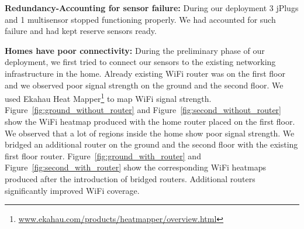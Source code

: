 \documentclass[10pt]{sensys-proc}
\newcommand{\figref}[1]{Figure~\ref{#1}}
\begin{document}
\noindent \textbf{Redundancy-Accounting for sensor failure:} During our deployment 3 jPlugs and 1 multisensor stopped functioning properly. We had accounted for such failure and had kept reserve sensors ready. %

\noindent \textbf{Homes have poor connectivity:} During the preliminary phase of our deployment, we first tried to connect our sensors to the existing networking infrastructure in the home. Already existing WiFi router was on the first floor and we observed poor signal strength on the ground and the second floor. We used Ekahau Heat Mapper\footnote{\url{www.ekahau.com/products/heatmapper/overview.html}} to map WiFi signal strength. \figref{fig:ground_without_router} and \figref{fig:second_without_router} show the WiFi heatmap produced with the home router placed on the first floor. We observed that a lot of regions inside the home show poor signal strength. We bridged an additional router on the ground and the second floor with the existing first floor router. \figref{fig:ground_with_router} and \figref{fig:second_with_router} show the corresponding WiFi heatmaps produced after the introduction of bridged routers. Additional routers significantly improved WiFi coverage. 
\end{document}
